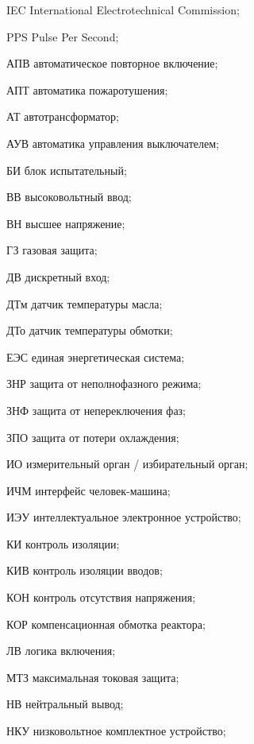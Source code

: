 \begin{list}{}%
{%
  \setlength{\labelwidth}{\abbrwidth}%
  \setlength{\labelsep}{0pt}%
  \setlength{\leftmargin}{\dimexpr\labelwidth+\labelsep\relax}%
  \setlength{\itemindent}{0pt}%
  \setlength{\parsep}{0pt}%
  \setlength{\itemsep}{0pt}
  \renewcommand{\makelabel}[1]{#1 --\hspace{\abbrgap}}%
}
\item[IEC]  International Electrotechnical Commission;
\item[PPS] Pulse Per Second;
\item[АПВ] автоматическое повторное включение;
\item[АПТ] автоматика пожаротушения;
\item[АТ] автотрансформатор;
\item[АУВ] автоматика управления выключателем;
\item[БИ] блок испытательный;
\item[ВВ] высоковольтный ввод;
\item[ВН] высшее напряжение;
\item[ГЗ] газовая защита;
\item[ДВ] дискретный вход;
\item[ДТм] датчик температуры масла;
\item[ДТо] датчик температуры обмотки;
\item[ЕЭС] единая энергетическая система;
\item[ЗНР] защита от неполнофазного режима;
\item[ЗНФ] защита от непереключения фаз;
\item[ЗПО] защита от потери охлаждения;
\item[ИО] измерительный орган / избирательный орган;
\item[ИЧМ] интерфейс человек-машина;
\item[ИЭУ] интеллектуальное электронное устройство;
\item[КИ] контроль изоляции;
\item[КИВ] контроль изоляции вводов;
\item[КОН] контроль отсутствия напряжения;
\item[КОР] компенсационная обмотка реактора;
\item[ЛВ] логика включения;
\item[МТЗ] максимальная токовая защита;
\item[НВ] нейтральный вывод;
\item[НКУ] низковольтное комплектное устройство;

\end{list}
